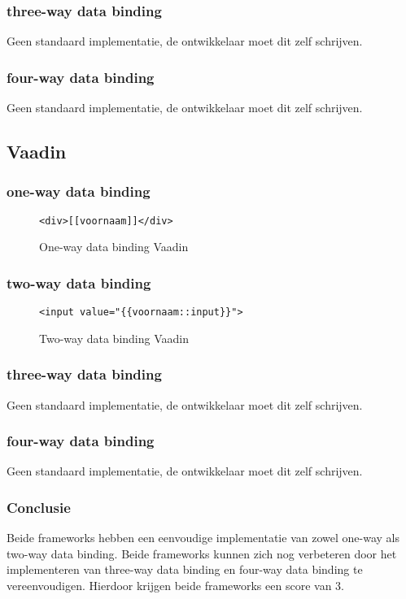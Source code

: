 \subsubsection{three-way data binding}
Geen standaard implementatie, de ontwikkelaar moet dit zelf schrijven.

\subsubsection{four-way data binding}
Geen standaard implementatie, de ontwikkelaar moet dit zelf schrijven.
\subsection{Vaadin}
\subsubsection{one-way data binding}

\begin{figure}[H]
\begin{lstlisting}
<div>[[voornaam]]</div>
\end{lstlisting}
\caption{One-way data binding Vaadin}
\end{figure}
\subsubsection{two-way data binding}
\begin{figure}[H]
\begin{lstlisting}
<input value="{{voornaam::input}}">
\end{lstlisting}
\caption{Two-way data binding Vaadin}
\end{figure}

\subsubsection{three-way data binding}
Geen standaard implementatie, de ontwikkelaar moet dit zelf schrijven.
\subsubsection{four-way data binding}
Geen standaard implementatie, de ontwikkelaar moet dit zelf schrijven.

\subsubsection{Conclusie}
Beide frameworks hebben een eenvoudige implementatie van zowel one-way als two-way data binding. Beide frameworks kunnen zich nog verbeteren door het implementeren van three-way data binding en four-way data binding te vereenvoudigen. Hierdoor krijgen beide frameworks een score van 3. 


